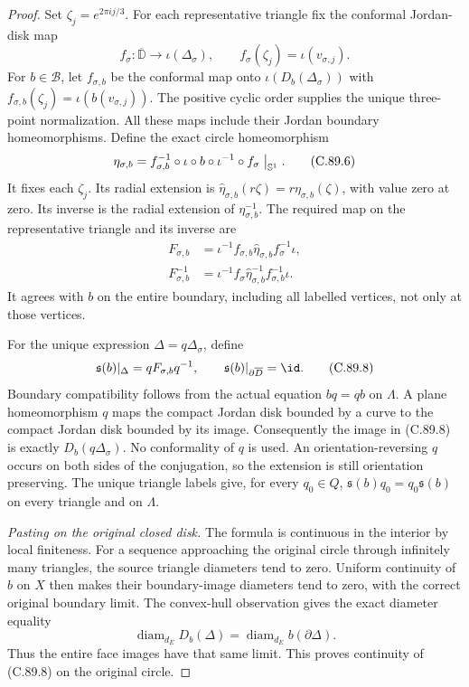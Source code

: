 \begin{proof}
Set $\zeta_j=e^{2\pi i j/3}$.
For each representative triangle fix
the conformal Jordan-disk map
\[
 f_\sigma:\overline{\mathbb D}
                 \longrightarrow\iota(\Delta_\sigma),
       \qquad f_\sigma(\zeta_j)=\iota(v_{\sigma,j}).
                                                                  \tag{C.89.5}
\]
For $b\in\mathscr B$, let
$f_{\sigma,b}$ be the conformal map
onto $\iota(D_b(\Delta_\sigma))$
with
$f_{\sigma,b}(\zeta_j)=\iota(b(v_{\sigma,j}))$.
The positive cyclic order supplies
the unique three-point normalization.
All these maps include their Jordan
boundary homeomorphisms.
Define the exact circle homeomorphism
\[
 \eta_{\sigma,b}
   =f_{\sigma,b}^{-1}\circ\iota\circ b
                  \circ\iota^{-1}\circ f_\sigma
                       \bigm|_{\mathbb S^1}.                   \tag{C.89.6}
\]
It fixes each $\zeta_j$.
Its radial extension is
$\widehat\eta_{\sigma,b}(r\zeta)
 =r\eta_{\sigma,b}(\zeta)$,
with value zero at zero. Its inverse
is the radial extension of
$\eta_{\sigma,b}^{-1}$.
The required map on the representative
triangle and its inverse are
\[
 \begin{aligned}
 F_{\sigma,b}
   &=\iota^{-1} f_{\sigma,b}
                 \widehat\eta_{\sigma,b} f_\sigma^{-1}\iota,\\
 F_{\sigma,b}^{-1}
   &=\iota^{-1} f_\sigma
           \widehat\eta_{\sigma,b}^{-1}f_{\sigma,b}^{-1}\iota .
 \end{aligned}                                                   \tag{C.89.7}
\]
It agrees with $b$ on the entire
boundary, including all labelled
vertices, not only at those vertices.

For the unique expression
$\Delta=q\Delta_\sigma$, define
\[
       \mathfrak s(b)|_{\Delta}
                  =q F_{\sigma,b}q^{-1},\qquad
       \mathfrak s(b)|_{\partial\overline D}=\id .
                                                                  \tag{C.89.8}
\]
Boundary compatibility follows from
the actual equation $bq=qb$ on
$\Lambda$. A plane homeomorphism
$q$ maps the compact Jordan disk
bounded by a curve to the compact
Jordan disk bounded by its image.
Consequently the image in (C.89.8)
is exactly $D_b(q\Delta_\sigma)$.
No conformality of $q$ is used.
An orientation-reversing $q$ occurs
on both sides of the conjugation,
so the extension is still orientation
preserving. The unique triangle
labels give, for every $q_0\in Q$,
$\mathfrak s(b)q_0=q_0\mathfrak s(b)$
on every triangle and on $\Lambda$.

\emph{Pasting on the original closed disk.}
The formula is continuous in the
interior by local finiteness.
For a sequence approaching the
original circle through infinitely
many triangles, the source triangle
diameters tend to zero.
Uniform continuity of $b$ on $X$
then makes their boundary-image
diameters tend to zero, with the
correct original boundary limit.
The convex-hull observation gives
the exact diameter equality
\[
 \operatorname{diam}_{d_E}D_b(\Delta)
             =\operatorname{diam}_{d_E}b(\partial\Delta).
                                                                  \tag{C.89.9}
\]
Thus the entire face images have
that same limit. This proves
continuity of (C.89.8) on the
original circle.


\end{proof}
